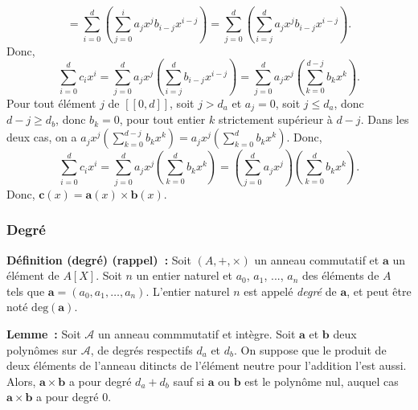 \begin{itemize}[nosep]
\begin{equation*}
                    = \sum_{i=0}^d \left( \sum_{j=0}^i a_j x^j b_{i-j} x^{i-j} \right)
                    = \sum_{j=0}^d \left( \sum_{i=j}^d a_j x^j b_{i-j} x^{i-j} \right).
            \end{equation*}
            Donc, 
            \begin{equation*}
                \sum_{i=0}^d c_i x^i 
                    = \sum_{j=0}^d a_j x^j \left( \sum_{i=j}^d b_{i-j} x^{i-j} \right)
                    = \sum_{j=0}^d a_j x^j \left( \sum_{k=0}^{d-j} b_k x^k \right).
            \end{equation*}
            Pour tout élément $j$ de $[\![0, d]\!]$, soit $j > d_a$ et $a_j = 0$, soit $j \leq d_a$, donc $d - j \geq d_b$, donc $b_k = 0$, pour tout entier $k$ strictement supérieur à $d-j$. 
            Dans les deux cas, on a $a_j x^j \left( \sum_{k=0}^{d-j} b_k x^k \right) = a_j x^j \left( \sum_{k=0}^{d} b_k x^k \right)$.
            Donc, 
            \begin{equation*}
                \sum_{i=0}^d c_i x^i 
                    = \sum_{j=0}^d a_j x^j \left( \sum_{k=0}^d b_k x^k \right)
                    = \left( \sum_{j=0}^d a_j x^j \right) \left( \sum_{k=0}^d b_k x^k \right).
            \end{equation*}
            Donc, $\mathbf{c}(x) = \mathbf{a}(x) \times \mathbf{b}(x)$.
    \end{itemize}

    \done

\subsubsection{Degré}

\noindent\textbf{Définition (degré) (rappel) :} Soit $(A, +, \times)$ un anneau commutatif et $\mathbf{a}$ un élément de $A[X]$.
    Soit $n$ un entier naturel et $a_0$, $a_1$, ..., $a_n$ des éléments de $A$ tels que $\mathbf{a} = (a_0, a_1, \dots, a_n)$.
    L'entier naturel $n$ est appelé \textit{degré} de $\mathbf{a}$, et peut être noté $\mathrm{deg}(\mathbf{a})$. 
\medskip

\noindent\textbf{Lemme :} Soit $\mathcal{A}$ un anneau commmutatif et intègre.
    Soit $\mathbf{a}$ et $\mathbf{b}$ deux polynômes sur $\mathcal{A}$, de degrés respectifs $d_a$ et $d_b$. 
    On suppose que le produit de deux éléments de l'anneau ditincts de l'élément neutre pour l'addition l'est aussi.
    Alors, $\mathbf{a} \times \mathbf{b}$ a pour degré $d_a + d_b$ sauf si $\mathbf{a}$ ou $\mathbf{b}$ est le polynôme nul, auquel cas $\mathbf{a} \times \mathbf{b}$ a pour degré $0$.

